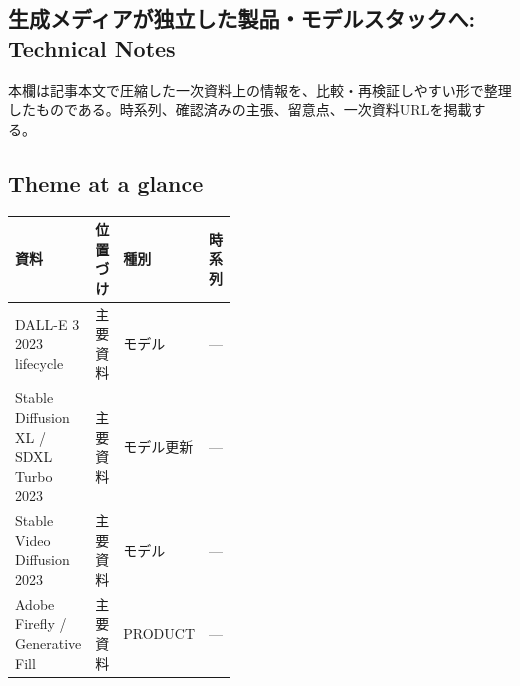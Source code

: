 \subsection*{生成メディアが独立した製品・モデルスタックへ: Technical Notes}
本欄は記事本文で圧縮した一次資料上の情報を、比較・再検証しやすい形で整理したものである。時系列、確認済みの主張、留意点、一次資料URLを掲載する。
\medskip
\subsection*{Theme at a glance}
\begin{center}
\footnotesize
\begin{tabularx}{\linewidth}{@{}p{0.20\linewidth}p{0.10\linewidth}p{0.14\linewidth}X@{}}
\toprule
資料 & 位置づけ & 種別 & 時系列 \\
\midrule
DALL-E 3 2023 lifecycle & 主要資料 & モデル & — \\
Stable Diffusion XL / SDXL Turbo 2023 & 主要資料 & モデル更新 & — \\
Stable Video Diffusion 2023 & 主要資料 & モデル & — \\
Adobe Firefly / Generative Fill & 主要資料 & PRODUCT & — \\
\bottomrule
\end{tabularx}
\end{center}
\normalsize

